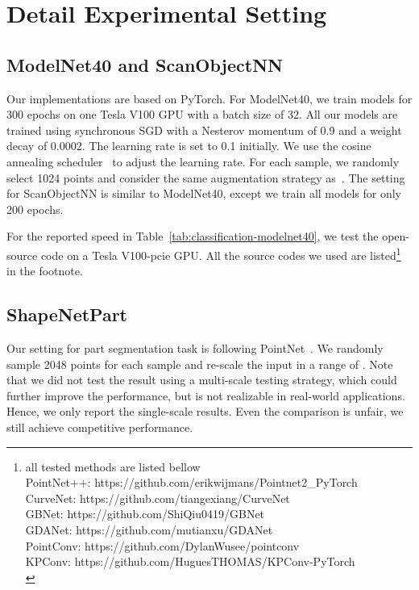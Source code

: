 \documentclass{article} \usepackage{iclr2022_conference,times}
\begin{document}
\section{Detail Experimental Setting}
\subsection{ModelNet40 and ScanObjectNN}
Our implementations are based on PyTorch. For ModelNet40, we train models for 300 epochs on one Tesla V100 GPU with a batch size of 32. All our models are trained using synchronous SGD with a Nesterov momentum of 0.9 and a weight decay of 0.0002. The learning rate is set to  0.1  initially. We use the cosine annealing scheduler~\citep{loshchilov2016sgdr} to adjust the learning rate. For each sample, we randomly select 1024 points and consider the same augmentation strategy as~\citet{qi2017pointnet++}. The setting for ScanObjectNN is similar to ModelNet40, except we train all models for only 200 epochs.

For the reported speed in Table~\ref{tab:classification-modelnet40}, we test the open-source code on a Tesla V100-pcie GPU. All the source codes we used are listed\footnote{
all tested methods are listed bellow\\
PointNet++: https://github.com/erikwijmans/Pointnet2\_PyTorch \\
CurveNet: https://github.com/tiangexiang/CurveNet \\
GBNet: https://github.com/ShiQiu0419/GBNet \\
GDANet: https://github.com/mutianxu/GDANet \\
PointConv: https://github.com/DylanWusee/pointconv \\
KPConv: https://github.com/HuguesTHOMAS/KPConv-PyTorch \\
}
in the footnote.



\subsection{ShapeNetPart}
Our setting for part segmentation task is following PointNet~\citep{qi2017pointnet}. We randomly sample 2048 points for each sample and re-scale the input in a range of . Note that we did not test the result using a multi-scale testing strategy, which could further improve the performance, but is not realizable in real-world applications. Hence, we only report the single-scale results. Even the comparison is unfair, we still achieve competitive performance.
\end{document}
